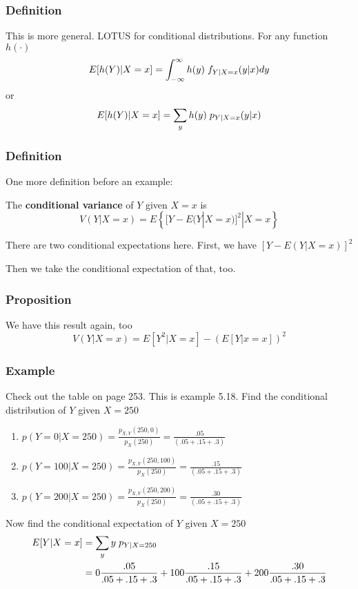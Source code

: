 \documentclass{beamer}
\begin{document}
\begin{frame}
\frametitle{Definition}

This is more general. LOTUS for conditional distributions. For any function $h(\cdot)$
\[
E[h(Y)|X=x] = \int_{-\infty}^{\infty} h(y) \hspace{1mm} f_{Y|X=x}(y|x) dy
\]
or
\[
E[h(Y)|X=x] = \sum_y h(y) \hspace{1mm} p_{Y|X=x}(y|x)
\]


\end{frame}

\begin{frame}
\frametitle{Definition}

One more definition before an example:
\newline

The \textbf{conditional variance} of $Y$ given $X =x$ is
\[
V(Y|X=x) = E \left\{ [Y - E(Y|X=x)]^2 | X=x \right\}
\]

\pause
There are two conditional expectations here. First, we have $ [Y - E(Y|X=x)]^2$
\newline

Then we take the conditional expectation of that, too.
\end{frame}

\begin{frame}
\frametitle{Proposition}

We have this result again, too
\[
V(Y|X=x) = E[Y^2|X=x] - (E[Y|x=x])^2
\]


\end{frame}

\begin{frame}
\frametitle{Example}

Check out the table on page 253. This is example 5.18. Find the conditional distribution of $Y$ given $X=250$

\begin{enumerate}
\item $p(Y = 0 | X=250) = \frac{p_{X,Y}(250,0)}{p_X(250)} = \frac{.05}{(.05 + .15 + .3)}$
\item $p(Y = 100 | X=250) = \frac{p_{X,Y}(250,100)}{p_X(250)} = \frac{.15}{(.05 + .15 + .3)}$
\item $p(Y = 200 | X=250) = \frac{p_{X,Y}(250,200)}{p_X(250)} = \frac{.30}{(.05 + .15 + .3)}$
\end{enumerate}

\pause
Now find the conditional expectation of $Y$ given $X = 250$
\begin{align*}
E[Y|X=x] &= \sum_y y \hspace{1mm} p_{Y|X=250} \\
&= 0\frac{.05}{.05 + .15 + .3} + 100\frac{.15}{.05 + .15 + .3} + 200 \frac{.30}{.05 + .15 + .3}
\end{align*}

\end{frame}
\end{document}
